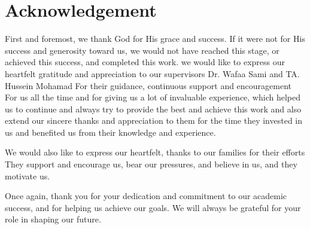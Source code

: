 \chapter{Acknowledgement}

First and foremost, we thank God for His grace and success. If it were not for His
success and generosity toward us, we would not have reached this stage, or achieved
this success, and completed this work.
we would like to express our heartfelt gratitude and appreciation to our supervisors
Dr. Wafaa Sami and TA. Hussein Mohamad For their guidance, continuous support
and encouragement For us all the time and for giving us a lot of invaluable
experience, which helped us to continue and always try to provide the best and
achieve this work and also extend our sincere thanks and appreciation to them
for the time they invested in us and benefited us from their knowledge and
experience.

We would also like to express our heartfelt, thanks to our families for their efforts
They support and encourage us, bear our pressures, and believe in us, and they
motivate us.


Once again, thank you for your dedication and commitment to our academic success, and
for helping us achieve our goals. We will always be grateful for your role in shaping our future.